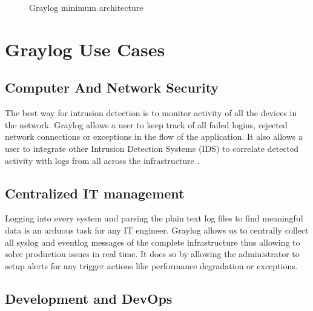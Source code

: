 \documentclass[9pt,twocolumn,twoside]{../../styles/osajnl}
\begin{document}
\begin{figure}[htbp]
\centering
{}
\caption{\cite{www-graylog-docs} Graylog minimum architecture}
\label{fig:Graylog Minimum Architecture}
\end{figure}

\section{Graylog Use Cases}

\subsection{Computer And Network Security}

The best way for intrusion detection is to monitor activity of all the
devices in the network.  Graylog allows a user to keep track of all
failed logins, rejected network connections or exceptions in the flow
of the application. It also allows a user to integrate other Intrusion
Detection Systems (IDS) to correlate detected activity with logs from
all across the infrastructure \cite{www-graylog-org}.

\subsection{Centralized IT management}

Logging into every system and parsing the plain text log files to find
meaningful data is an arduous task for any IT engineer. Graylog allows
us to centrally collect all syslog and eventlog messages of the
complete infrastructure thus allowing to solve production issues in
real time. It does so by allowing the administrator to setup alerts
for any trigger actions like performance degradation or exceptions.

\subsection{Development and DevOps}
\end{document}
